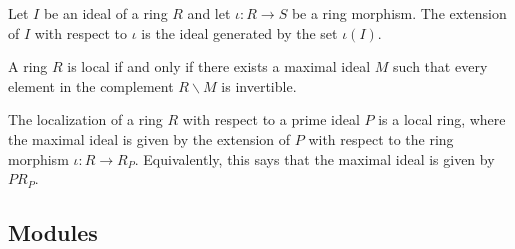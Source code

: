     \begin{construct}[Extension]
        Let $I$ be an ideal of a ring $R$ and let $\iota:R\rightarrow S$ be a ring morphism. The extension of $I$ with respect to $\iota$ is the ideal generated by the set $\iota(I)$.
    \end{construct}


    \begin{property}\label{algebra:local_ring_invertible}
        A ring $R$ is local if and only if there exists a maximal ideal $M$ such that every element in the complement $R\backslash M$ is invertible.
    \end{property}

    \begin{property}\label{algebra:localization_local_ring}
        The localization of a ring $R$ with respect to a prime ideal $P$ is a local ring, where the maximal ideal is given by the extension of $P$ with respect to the ring morphism $\iota:R\rightarrow R_P$. Equivalently, this says that the maximal ideal is given by $PR_P$.
    \end{property}


\subsection{Modules}

